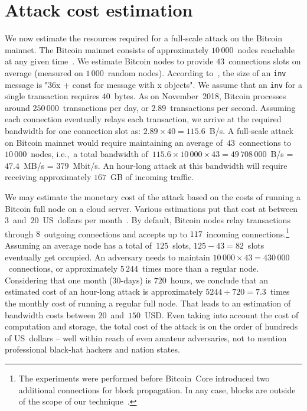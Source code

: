 \section{Attack cost estimation}

We now estimate the resources required for a full-scale attack on the Bitcoin mainnet.
The Bitcoin mainnet consists of approximately $10\,000$~nodes reachable at any given time~\cite{Bitnodes}.
We estimate Bitcoin nodes to provide $43$~connections slots on average (measured on $1\,000$~random nodes).
According to~\cite{BitcoinWiki}, the size of an \texttt{inv} message is "36x + const for message with x objects".
We assume that an \texttt{inv} for a single transaction requires $40$~bytes.
As on November~2018, Bitcoin processes around $250\,000$~transactions per day, or $2.89$~transactions per second.
Assuming each connection eventually relays each transaction, we arrive at the required bandwidth for one connection slot as: $2.89 \times 40 = 115.6$~B/s.
A full-scale attack on Bitcoin mainnet would require maintaining an average of~$43$~connections to $10\,000$~nodes, i.e.,~a total bandwidth of~$115.6 \times 10\,000 \times 43 = 49\,708\,000$~B/s = $47.4$~MB/s = $379$~Mbit/s.
An hour-long attack at this bandwidth will require receiving approximately $167$~GB of incoming traffic.

We may estimate the monetary cost of the attack based on the costs of running a Bitcoin full node on a cloud server.
Various estimations put that cost at between $3$~and~$20$~US~dollars per month~\cite{Zeyde2018, Connell2017}.
By default, Bitcoin nodes relay transactions through $8$~outgoing connections and accepts up to $117$~incoming connections.\footnote{The experiments were performed before Bitcoin~Core introduced two additional connections for block propagation. In any case, blocks are outside of the scope of our technique~\cite{Daftuar2019}.}
Assuming an average node has a total of~$125$~slots, $125 - 43 = 82$~slots eventually get occupied.
An adversary needs to maintain $10\,000 \times 43 = 430\,000$~connections, or approximately $5\,244$~times more than a regular node.
Considering that one month ($30$-days) is $720$~hours, we conclude that an estimated cost of an hour-long attack is approximately $5244 \div 720 = 7.3$~times the monthly cost of running a regular full node.
That leads to an estimation of bandwidth costs between $20$~and~$150$~USD\@.
Even taking into account the cost of computation and storage, the total cost of the attack is on the order of hundreds of US~dollars -- well within reach of even amateur adversaries, not to mention professional black-hat hackers and nation states.

